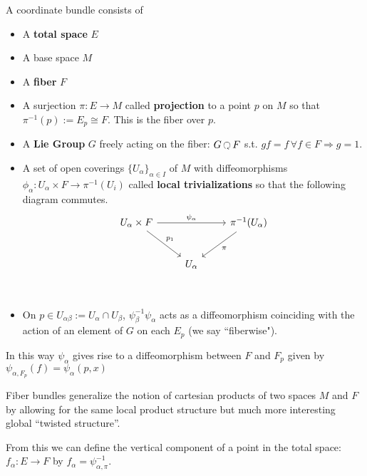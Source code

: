 		\begin{defn}
			A coordinate bundle consists of 
			\begin{itemize}
				\item A \textbf{total space} $E$
				\item A base space $M$
				\item A \textbf{fiber} $F$
				\item A surjection $\pi : E \rightarrow M $ called \textbf{projection} to a point $p$ on $M$ so that $\pi^{-1}(p) := E_p \cong F$. This is the fiber over $p$.
				\item A \textbf{Lie Group} $G$ freely acting on the fiber: $G \lacts F$ s.t. $g f = f \, \forall f \in F \Rightarrow g = 1$.
				\item A set of open coverings $\{ U_\alpha \}_{\alpha \in I}$ of $M$ with diffeomorphisms $\phi_\alpha: U_\alpha \times F \rightarrow \pi^{-1} (U_i)$ called \textbf{local trivializations} so that the following diagram commutes. 
				\[
				\begin{tikzcd}[row sep=2.5em]
				U_\alpha \times F \arrow{dr}{p_1} \arrow{rr}{\psi_\alpha} && \pi^{-1}(U_\alpha) \arrow{dl}{\pi} \\
				 & U_\alpha \\
				\end{tikzcd}
				\]
				\item On $p \in U_{\alpha \beta} := U_\alpha \cap U_\beta$, $\psi_\beta^{-1} \psi_\alpha$ acts as a diffeomorphism coinciding with the action of an element of $G$ on each $E_p$ (we say ``fiberwise"). 
			\end{itemize}
			In this way $\psi_\alpha$ gives rise to a diffeomorphism between $F$ and $F_p$ given by $\psi_{\alpha, F_p} (f) = \psi_\alpha (p, x)$
		\end{defn}
		Fiber bundles generalize the notion of cartesian products of two spaces $M$ and $F$ by allowing for the same local product structure but much more interesting global ``twisted structure''.
		
		From this we can define the vertical component of a point in the total space: $f_\alpha: E \rightarrow F$ by $f_\alpha = \psi^{-1}_{\alpha, \pi}$. 
		
